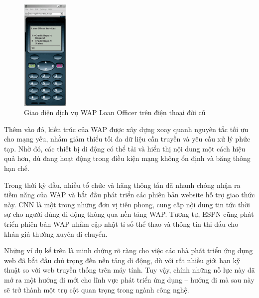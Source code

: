 \begin{figure}[h]
  \centering
  \includegraphics[width=0.2\textwidth]{images/cc301785.mobilefig02(en-us,msdn.10).png}
  \caption{Giao diện dịch vụ WAP Loan Officer trên điện thoại đời cũ}
  \label{fig:fig10}
\end{figure}
  
  \begin{flushleft}
  \hspace*{0.8cm}Thêm vào đó, kiến trúc của WAP được xây dựng xoay quanh nguyên tắc tối ưu cho mạng yếu, nhằm giảm thiểu tối đa dữ liệu cần truyền và yêu cầu xử lý phức tạp. Nhờ đó, các thiết bị di động có thể tải và hiển thị nội dung một cách hiệu quả hơn, dù đang hoạt động trong điều kiện mạng không ổn định và băng thông hạn chế.
  \end{flushleft}
  
  \begin{flushleft}
  \hspace*{0.8cm}Trong thời kỳ đầu, nhiều tổ chức và hãng thông tấn đã nhanh chóng nhận ra tiềm năng của WAP và bắt đầu phát triển các phiên bản website hỗ trợ giao thức này. CNN là một trong những đơn vị tiên phong, cung cấp nội dung tin tức thời sự cho người dùng di động thông qua nền tảng WAP. Tương tự, ESPN cũng phát triển phiên bản WAP nhằm cập nhật tỉ số thể thao và thông tin thi đấu cho khán giả thường xuyên di chuyển\cite{cnn-espn-wap}.
  \end{flushleft}
  
  \begin{flushleft}
  \hspace*{0.8cm}Những ví dụ kể trên là minh chứng rõ ràng cho việc các nhà phát triển ứng dụng web đã bắt đầu chú trọng đến nền tảng di động, dù với rất nhiều giới hạn kỹ thuật so với web truyền thống trên máy tính. Tuy vậy, chính những nỗ lực này đã mở ra một hướng đi mới cho lĩnh vực phát triển ứng dụng – hướng đi mà sau này sẽ trở thành một trụ cột quan trọng trong ngành công nghệ.
  \end{flushleft}
  
